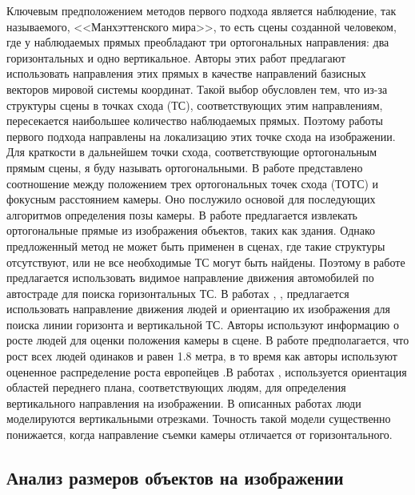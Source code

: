 Ключевым предположением методов первого подхода является наблюдение, так называемого, <<Манхэттенского мира>>, то есть сцены созданной человеком, где у наблюдаемых прямых преобладают три ортогональных направления: два горизонтальных и одно вертикальное. Авторы этих работ предлагают использовать направления этих прямых в качестве направлений базисных векторов мировой системы координат. Такой выбор обусловлен тем, что из-за структуры сцены в точках схода (ТС), соответствующих этим направлениям, пересекается наибольшее количество наблюдаемых прямых. Поэтому работы первого подхода направлены на локализацию этих точке схода на изображении. Для краткости в дальнейшем точки схода, соответствующие ортогональным прямым сцены, я буду называть ортогональными. В работе \cite{caprile1990using} представлено соотношение между положением трех ортогональных точек схода (ТОТС) и фокусным расстоянием камеры. Оно послужило основой для последующих алгоритмов определения позы камеры. В работе \cite{li2010simultaneous} предлагается извлекать ортогональные прямые из изображения объектов, таких как здания. Однако предложенный метод не может быть применен в сценах, где такие структуры отсутствуют, или не все необходимые ТС могут быть найдены. Поэтому в работе \cite{dubska2014automatic} предлагается использовать видимое направление движения автомобилей по автостраде для поиска горизонтальных ТС. В работах \cite{chen2007accurate}, \cite{liu2011surveillance}, \cite{den2015automatic} предлагается использовать направление движения людей и ориентацию их изображения для поиска линии горизонта и вертикальной ТС. Авторы используют информацию о росте людей для оценки положения камеры в сцене. В работе \cite{den2015automatic} предполагается, что рост всех людей одинаков и равен 1.8 метра, в то время как авторы \cite{liu2011surveillance} используют оцененное распределение роста европейцев \cite{visscher2008sizing}.В работах \cite{chen2007accurate}, \cite{liu2011surveillance} используется ориентация областей переднего плана, соответствующих людям, для определения вертикального направления на изображении. В описанных работах люди моделируются вертикальными отрезками. Точность такой модели существенно понижается, когда направление съемки камеры отличается от горизонтального.

\subsection{Анализ размеров объектов на изображении}

